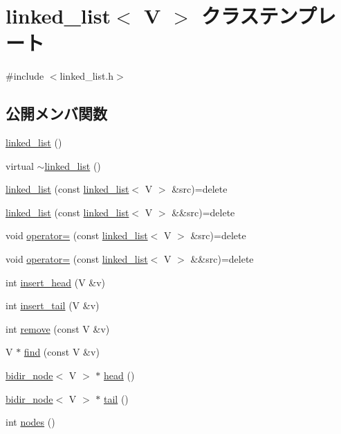 \hypertarget{classlinked__list}{}\section{linked\+\_\+list$<$ V $>$ クラステンプレート}
\label{classlinked__list}


{\ttfamily \#include $<$linked\+\_\+list.\+h$>$}

\subsection*{公開メンバ関数}
\begin{DoxyCompactItemize}
\item 
\hyperlink{classlinked__list_af003adae8c8ad169c0836a178da51431}{linked\+\_\+list} ()
\item 
virtual \hyperlink{classlinked__list_adae66055eedccbf29e7efd3692ad60e9}{$\sim$linked\+\_\+list} ()
\item 
\hyperlink{classlinked__list_aaf6d89a06323148a3bfa85f98e73ec34}{linked\+\_\+list} (const \hyperlink{classlinked__list}{linked\+\_\+list}$<$ V $>$ \&src)=delete
\item 
\hyperlink{classlinked__list_a627932cc8618cd1bae44935116702d29}{linked\+\_\+list} (const \hyperlink{classlinked__list}{linked\+\_\+list}$<$ V $>$ \&\&src)=delete
\item 
void \hyperlink{classlinked__list_a32097a2dcd6f5f0f20c9b3e29a3f631e}{operator=} (const \hyperlink{classlinked__list}{linked\+\_\+list}$<$ V $>$ \&src)=delete
\item 
void \hyperlink{classlinked__list_a76ecccef113b75399c1243a6dc1763c4}{operator=} (const \hyperlink{classlinked__list}{linked\+\_\+list}$<$ V $>$ \&\&src)=delete
\item 
int \hyperlink{classlinked__list_aa87b1801b0701151561b449df924a1f6}{insert\+\_\+head} (V \&v)
\item 
int \hyperlink{classlinked__list_a97ae2482ebf484475b017dfd104b4860}{insert\+\_\+tail} (V \&v)
\item 
int \hyperlink{classlinked__list_a449bb389d8a0562078effe8a5cbce4ed}{remove} (const V \&v)
\item 
V $\ast$ \hyperlink{classlinked__list_aed6c01e534aab66ece6429d836f39f8f}{find} (const V \&v)
\item 
\hyperlink{classbidir__node}{bidir\+\_\+node}$<$ V $>$ $\ast$ \hyperlink{classlinked__list_a5ec6ef95a6d392bb7389637d9e5d87b5}{head} ()
\item 
\hyperlink{classbidir__node}{bidir\+\_\+node}$<$ V $>$ $\ast$ \hyperlink{classlinked__list_aefd6410f20630d227f0d4d4ed895d15b}{tail} ()
\item 
int \hyperlink{classlinked__list_aa79d43937baecb85adc0731c3c078129}{nodes} ()
\end{DoxyCompactItemize}


